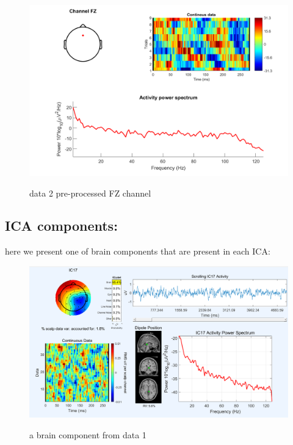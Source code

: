 \documentclass[11pt]{article}
\begin{document}
\begin{figure}[H]
    \begin{center}
        \includegraphics[scale=0.6]{Fig/Fz_spectra_preprocessed_data2.png}
        \label{fig:fzPre2}
        \caption{data 2 pre-processed FZ channel}
    \end{center}
\end{figure}

\subsection*{ICA components:}
here we present one of brain components that are present in each ICA: \\

\begin{figure}[H]
    \begin{center}
        \includegraphics[scale=0.6]{Fig/brain_IC17_data1.png}
        \label{fig:brain1}
        \caption{a brain component from data 1}
    \end{center}
\end{figure}
\end{document}
